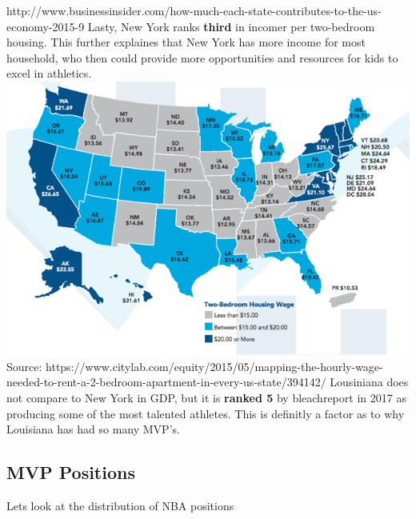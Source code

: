 \documentclass[11pt]{article}
\makeatletter
\def\maxwidth{\ifdim\Gin@nat@width>\linewidth\linewidth
    \else\Gin@nat@width\fi}
\let\Oldincludegraphics\includegraphics
\renewcommand{\includegraphics}[1]{\Oldincludegraphics[width=.8\maxwidth]{#1}}
\makeatother
\begin{document}
http://www.businessinsider.com/how-much-each-state-contributes-to-the-us-economy-2015-9
\newline
\newline
Lasty, New York ranks \textbf{third} in incomer per two-bedroom housing.
This further explaines that New York has more income for most household,
who then could provide more opportunities and resources for kids to
excel in athletics. \newline
\newline
\includegraphics{newyork_income.png} \newline  Source:
https://www.citylab.com/equity/2015/05/mapping-the-hourly-wage-needed-to-rent-a-2-bedroom-apartment-in-every-us-state/394142/
\newline
\newline
Lousiniana does not compare to New York in GDP, but it is \textbf{ranked
5} by bleachreport in 2017 as producing some of the most talented
athletes. This is definitly a factor as to why Louisiana has had so many
MVP's. 

    \subsection{MVP Positions}\label{mvp-positions}

Lets look at the distribution of NBA positions
\end{document}
